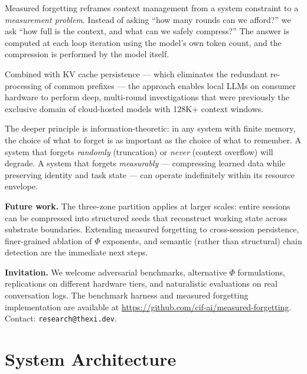 \documentclass[11pt,a4paper]{article}
\begin{document}
Measured forgetting reframes context management from a system constraint to a \emph{measurement problem}. Instead of asking ``how many rounds can we afford?'' we ask ``how full is the context, and what can we safely compress?'' The answer is computed at each loop iteration using the model's own token count, and the compression is performed by the model itself.

Combined with KV cache persistence --- which eliminates the redundant re-processing of common prefixes --- the approach enables local LLMs on consumer hardware to perform deep, multi-round investigations that were previously the exclusive domain of cloud-hosted models with 128K+ context windows.

The deeper principle is information-theoretic: in any system with finite memory, the choice of what to forget is as important as the choice of what to remember. A system that forgets \emph{randomly} (truncation) or \emph{never} (context overflow) will degrade. A system that forgets \emph{measurably} --- compressing learned data while preserving identity and task state --- can operate indefinitely within its resource envelope.

\textbf{Future work.} The three-zone partition applies at larger scales: entire sessions can be compressed into structured seeds that reconstruct working state across substrate boundaries. Extending measured forgetting to cross-session persistence, finer-grained ablation of $\Phi$ exponents, and semantic (rather than structural) chain detection are the immediate next steps.

\textbf{Invitation.} We welcome adversarial benchmarks, alternative $\Phi$ formulations, replications on different hardware tiers, and naturalistic evaluations on real conversation logs. The benchmark harness and measured forgetting implementation are available at \url{https://github.com/cif-ai/measured-forgetting}. Contact: \texttt{research@thexi.dev}.

\appendix
\section{System Architecture}
\end{document}
